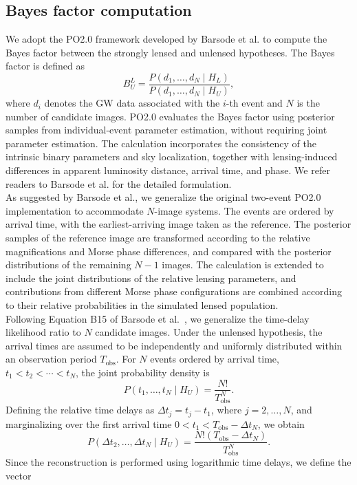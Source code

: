 \documentclass[linenumbers,amsmath,trackchanges]{aastex702}
\begin{document}
\subsection{Bayes factor computation}
We adopt the PO2.0 framework developed by Barsode et al. \cite{18} to compute the Bayes factor between 
the strongly lensed and unlensed hypotheses. The Bayes factor is defined as
\[
B_U^L = \frac{P(d_1,\ldots,d_N\mid H_L)}{P(d_1,\ldots,d_N\mid H_U)},
\]
where \(d_i\) denotes the GW data associated with the \(i\)-th event and \(N\) is the number of 
candidate images. PO2.0 evaluates the Bayes factor using posterior samples from individual-event 
parameter estimation, without requiring joint parameter estimation. The calculation incorporates 
the consistency of the intrinsic binary parameters and sky localization, together with lensing-induced 
differences in apparent luminosity distance, arrival time, and phase. We refer readers to Barsode 
et al. for the detailed formulation.\\
As suggested by Barsode et al., we generalize the original two-event PO2.0 implementation to accommodate 
\(N\)-image systems. The events are ordered by arrival time, with the earliest-arriving image taken 
as the reference. The posterior samples of the reference image are transformed according to the 
relative magnifications and Morse phase differences, and compared with the posterior distributions 
of the remaining \(N-1\) images. The calculation is extended to include the joint distributions of 
the relative lensing parameters, and contributions from different Morse phase configurations are 
combined according to their relative probabilities in the simulated lensed population.\\
Following Equation B15 of Barsode et al.~\cite{18}, we generalize the time-delay likelihood ratio to 
\(N\) candidate images. Under the unlensed hypothesis, the arrival times are assumed to be independently 
and uniformly distributed within an observation period \(T_{\mathrm{obs}}\). For \(N\) events ordered 
by arrival time, \(t_1<t_2<\cdots<t_N\), the joint probability density is
\[
P(t_1,\ldots,t_N\mid H_U)=\frac{N!}{T_{\mathrm{obs}}^N}.
\]
Defining the relative time delays as \(\Delta t_j=t_j-t_1\), where \(j=2,\ldots,N\), and marginalizing 
over the first arrival time \(0<t_1<T_{\mathrm{obs}}-\Delta t_N\), we obtain
\[
P(\Delta t_2,\ldots,\Delta t_N\mid H_U) = \frac{N!(T_{\mathrm{obs}}-\Delta t_N)}{T_{\mathrm{obs}}^N}.
\]
Since the reconstruction is performed using logarithmic time delays, we define the vector 
\end{document}
